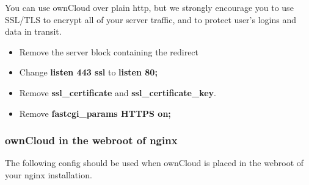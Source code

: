 \documentclass[letterpaper,10pt,english]{sphinxmanual}
\begin{document}
You can use ownCloud over plain http, but we strongly encourage you to use
SSL/TLS to encrypt all of your server traffic, and to protect user's logins and
data in transit.
\begin{itemize}
\item {} 
Remove the server block containing the redirect

\item {} 
Change \textbf{listen 443 ssl} to \textbf{listen 80;}

\item {} 
Remove \textbf{ssl\_certificate} and \textbf{ssl\_certificate\_key}.

\item {} 
Remove \textbf{fastcgi\_params HTTPS on;}

\end{itemize}


\subsubsection{ownCloud in the webroot of nginx}
\label{installation/nginx_examples:owncloud-in-the-webroot-of-nginx}
The following config should be used when ownCloud is placed in the webroot of
your nginx installation.
\end{document}
